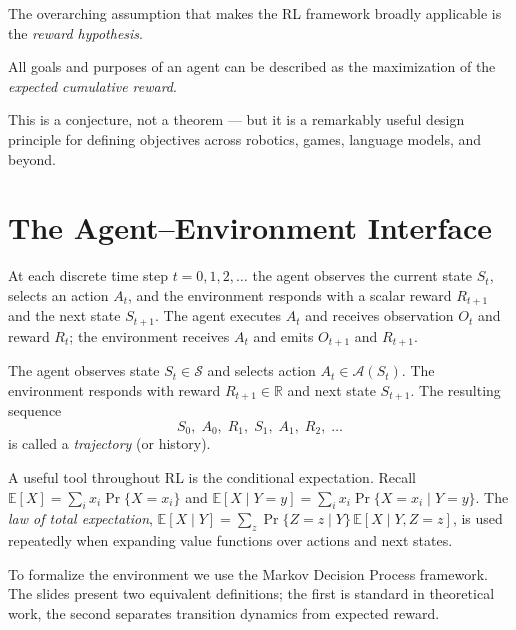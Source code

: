 \documentclass[11pt, oneside]{book}
\newcommand{\R}{\mathbb{R}}
\newcommand{\E}{\mathbb{E}}              %
\newcommand{\Sset}{\mathcal{S}}          %
\newcommand{\Aset}{\mathcal{A}}          %
\begin{document}
The overarching assumption that makes the RL framework broadly applicable is the
\emph{reward hypothesis}.

\begin{defbox}[title={Reward Hypothesis}]
All goals and purposes of an agent can be described as the maximization of the
\emph{expected cumulative reward}.
\end{defbox}

This is a conjecture, not a theorem --- but it is a remarkably useful design principle
for defining objectives across robotics, games, language models, and beyond.

\section{The Agent--Environment Interface}

At each discrete time step $t = 0, 1, 2, \dots$ the agent observes the current state
$S_t$, selects an action $A_t$, and the environment responds with a scalar reward
$R_{t+1}$ and the next state $S_{t+1}$.
The agent executes $A_t$ and receives observation $O_t$ and reward $R_t$; the
environment receives $A_t$ and emits $O_{t+1}$ and $R_{t+1}$.

\begin{defbox}[title={Trajectory}]
The agent observes state $S_t \in \Sset$ and selects action $A_t \in \Aset(S_t)$.
The environment responds with reward $R_{t+1} \in \R$ and next state $S_{t+1}$.
The resulting sequence
\[
  S_0,\; A_0,\; R_1,\; S_1,\; A_1,\; R_2,\; \dots
\]
is called a \emph{trajectory} (or history).
\end{defbox}

A useful tool throughout RL is the conditional expectation.
Recall $\E[X] = \sum_i x_i \Pr\{X = x_i\}$ and
$\E[X \mid Y=y] = \sum_i x_i \Pr\{X = x_i \mid Y = y\}$.
The \emph{law of total expectation},
$\E[X \mid Y] = \sum_z \Pr\{Z=z \mid Y\}\,\E[X \mid Y, Z=z]$,
is used repeatedly when expanding value functions over actions and next states.

To formalize the environment we use the Markov Decision Process framework.
The slides present two equivalent definitions; the first is standard in theoretical
work, the second separates transition dynamics from expected reward.
\end{document}
